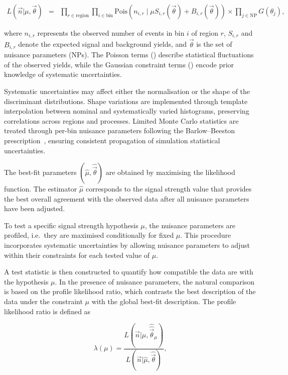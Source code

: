 \begin{eqnarray}
    L\left(\vec{n}|\mu, \vec{\theta}\right) 
    &=& 
    \prod_{r \in \text{region}}
    \prod_{i\in \text{bin}} 
    \text{Pois}\left(n_{i,r} \mid \mu S_{i,r}(\vec{\theta}) + B_{i,r}(\vec{\theta})\right)
    \times
    \prod_{j\in \text{NP}}
    G\left(\theta_j\right),
    \label{eq:Likelihood}
\end{eqnarray}

where $n_{i,r}$ represents the observed number of events in bin $i$ of region $r$, 
$S_{i,r}$ and $B_{i,r}$ denote the expected signal and background yields, 
and $\vec{\theta}$ is the set of nuisance parameters (NPs). 
The Poisson terms () describe statistical fluctuations of the observed yields, while the Gaussian constraint terms () encode prior knowledge of systematic uncertainties.

Systematic uncertainties may affect either the normalisation or the shape of the discriminant distributions. 
Shape variations are implemented through template interpolation between nominal and systematically varied histograms, preserving correlations across regions and processes. 
Limited Monte Carlo statistics are treated through per-bin nuisance parameters following the Barlow--Beeston prescription~\cite{Dembinski2022BarlowBeeston}, ensuring consistent propagation of simulation statistical uncertainties.

The best-fit parameters $(\hat{\mu},\hat{\vec{\theta}})$ are obtained by maximising the likelihood function. 
The estimator $\hat{\mu}$ corresponds to the signal strength value that provides the best overall agreement with the observed data after all nuisance parameters have been adjusted.

To test a specific signal strength hypothesis $\mu$, the nuisance parameters are profiled, 
i.e.\ they are maximised conditionally for fixed $\mu$. 
This procedure incorporates systematic uncertainties by allowing nuisance parameters to adjust within their constraints for each tested value of $\mu$.

A test statistic is then constructed to quantify how compatible the data are with the hypothesis $\mu$. 
In the presence of nuisance parameters, the natural comparison is based on the profile likelihood ratio, which contrasts the best description of the data under the constraint $\mu$ with the global best-fit description. 
The profile likelihood ratio is defined as

\begin{equation}
\lambda(\mu) =
\frac{L(\vec{n}|\mu,\hat{\hat{\vec{\theta}}}_\mu)}
     {L(\vec{n}|\hat{\mu},\hat{\vec{\theta}})},
\end{equation}

